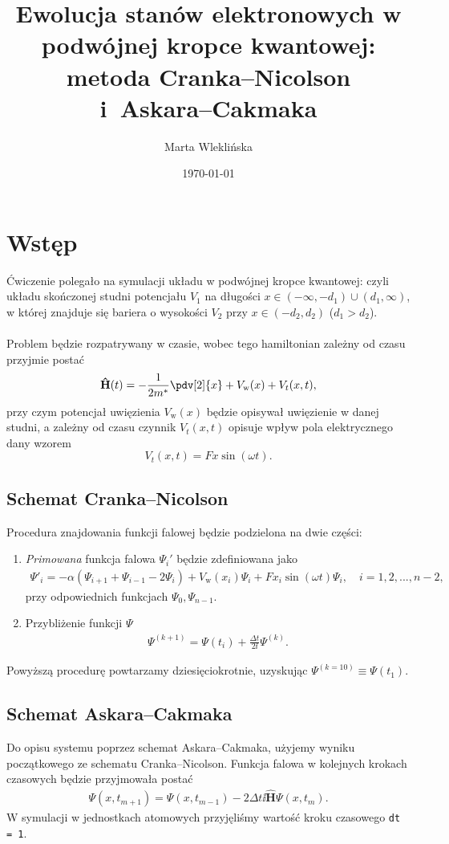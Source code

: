 \documentclass{article}
\title{Ewolucja stanów elektronowych w podwójnej kropce kwantowej: metoda Cranka--Nicolson i~Askara--Cakmaka}
\author{Marta Wleklińska}
\date{\today}
\begin{document}
\maketitle

\section{Wstęp}
Ćwiczenie polegało na symulacji układu w podwójnej kropce kwantowej: czyli układu skończonej studni potencjału $V_1$ na długości $x \in (-\infty, -d_1)\cup (d_1, \infty)$, w której znajduje się bariera o wysokości $V_2$ przy $x\in (-d_2, d_2)$ ($d_1>d_2$).\\
\\
Problem będzie rozpatrywany w czasie, wobec tego hamiltonian zależny od czasu przyjmie postać
\begin{gather}
    \mathbf{\hat{H}}(t) = -\frac{1}{2m^*}\pdv[2]{x} + V_{\text{w}}(x) + V_{t}(x, t),
    \label{eq:hamiltonian}
\end{gather}
przy czym potencjał uwięzienia $V_{\text{w}}(x)$ będzie opisywał uwięzienie w danej studni, a zależny od czasu czynnik $V_{t}(x, t)$ opisuje wpływ pola elektrycznego dany wzorem
\begin{equation}
    V_t(x, t) = Fx\sin(\omega t).
    \label{eq:time dependent ele}
\end{equation}
\subsection{Schemat Cranka--Nicolson}
Procedura znajdowania funkcji falowej będzie podzielona na dwie części:
\begin{enumerate}
    \item \textit{Primowana} funkcja falowa $\Psi_i'$ będzie zdefiniowana jako
    \begin{gather}
        \Psi'_i = -\alpha \left(\Psi_{i+1} + \Psi_{i-1} - 2 \Psi_{i}\right) + V_{\text{w}}(x_i)\Psi_i + Fx_i\sin(\omega t)\Psi_i, \quad i = 1, 2, ... , n-2,
    \end{gather}
    przy odpowiednich funkcjach $\Psi_0, \Psi_{n-1}$.
    \item Przybliżenie funkcji $\Psi$
    \begin{gather}
        \Psi^{(k+1)} = \Psi(t_i) + \frac{\Delta t}{2\ii}\Psi^{(k)}.
    \end{gather}
\end{enumerate}
Powyższą procedurę powtarzamy dziesięciokrotnie, uzyskując $\Psi^{(k=10)} \equiv \Psi(t_1)$.
\subsection{Schemat Askara--Cakmaka}
Do opisu systemu poprzez schemat Askara--Cakmaka, użyjemy wyniku początkowego ze schematu Cranka--Nicolson.
Funkcja falowa w kolejnych krokach czasowych będzie przyjmowała postać
\begin{gather}
    \Psi(x, t_{m+1}) = \Psi(x, t_{m-1}) - {2\Delta t}{\ii}\mathbf{\hat{H}}\Psi(x, t_{m}).
\end{gather}
W symulacji w jednostkach atomowych przyjęliśmy wartość kroku czasowego \texttt{dt = 1}.
\end{document}

